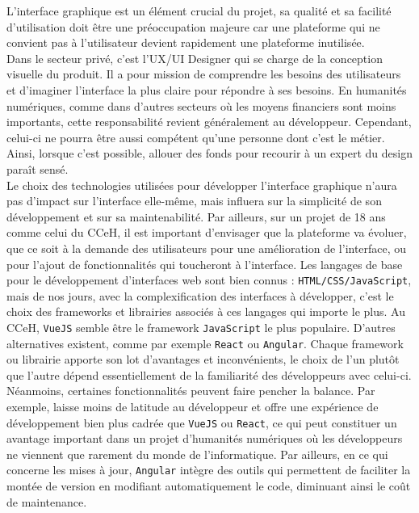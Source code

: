 L’interface graphique est un élément crucial du projet, sa qualité et sa facilité d’utilisation doit être une préoccupation majeure car une plateforme qui ne convient pas à l'utilisateur devient rapidement une plateforme inutilisée.\\ 

Dans le secteur privé, c’est l’UX/UI Designer qui se charge de la conception visuelle du produit. Il a pour mission de comprendre les besoins des utilisateurs et d’imaginer l’interface la plus claire pour répondre à ses besoins.
En humanités numériques, comme dans d’autres secteurs où les moyens financiers sont moins importants, cette responsabilité revient généralement au développeur. Cependant, celui-ci ne pourra être aussi compétent qu’une personne dont c’est le métier. Ainsi, lorsque c’est possible, allouer des fonds pour recourir à un expert du design paraît sensé.\\  
Le choix des technologies utilisées pour développer l’interface graphique n’aura pas d’impact sur l’interface elle-même, mais influera sur la simplicité de son développement et sur sa maintenabilité. Par ailleurs, sur un projet de 18 ans comme celui du CCeH, il est important d’envisager que la plateforme va évoluer, que ce soit à la demande des utilisateurs pour une amélioration de l’interface, ou pour l’ajout de fonctionnalités qui toucheront à l’interface. Les langages de base pour le développement d’interfaces web sont bien connus : \verb|HTML/CSS/JavaScript|, mais de nos jours, avec la complexification des interfaces à développer, c’est le choix des frameworks et librairies associés à ces langages qui importe le plus. Au CCeH, \verb|VueJS| semble être le framework \verb|JavaScript| le plus populaire. D’autres alternatives existent, comme par exemple \verb|React| ou \verb|Angular|. Chaque framework ou librairie apporte son lot d’avantages et inconvénients, le choix de l’un plutôt que l'autre dépend essentiellement de la familiarité des développeurs avec celui-ci. Néanmoins, certaines fonctionnalités peuvent faire pencher la balance. Par exemple,  laisse moins de latitude au développeur et offre une expérience de développement bien plus cadrée que \verb|VueJS| ou \verb|React|, ce qui peut constituer un avantage important dans un projet d’humanités numériques où les développeurs ne viennent que rarement du monde de l’informatique. Par ailleurs, en ce qui concerne les mises à jour, \verb|Angular| intègre des outils qui permettent de faciliter la montée de version en modifiant automatiquement le code, diminuant ainsi le coût de maintenance. \\ 
